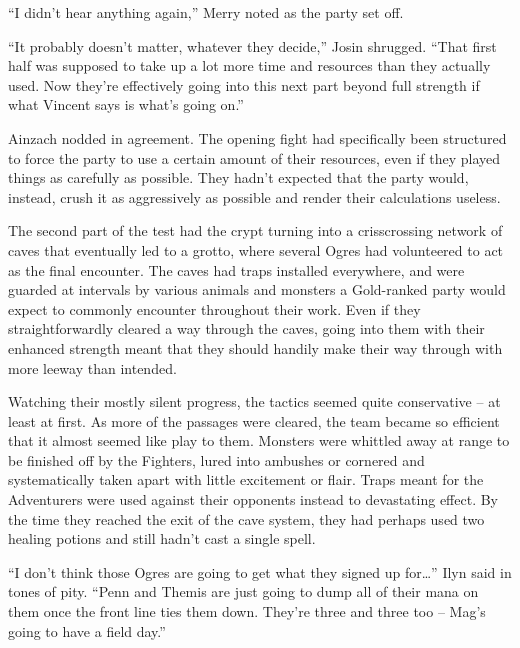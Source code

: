 

“I didn’t hear anything again,” Merry noted as the party set off.

 

“It probably doesn’t matter, whatever they decide,” Josin shrugged. “That first half was supposed to take up a lot more time and resources than they actually used. Now they’re effectively going into this next part beyond full strength if what Vincent says is what’s going on.”

 

Ainzach nodded in agreement. The opening fight had specifically been structured to force the party to use a certain amount of their resources, even if they played things as carefully as possible. They hadn’t expected that the party would, instead, crush it as aggressively as possible and render their calculations useless.

 

The second part of the test had the crypt turning into a crisscrossing network of caves that eventually led to a grotto, where several Ogres had volunteered to act as the final encounter. The caves had traps installed everywhere, and were guarded at intervals by various animals and monsters a Gold-ranked party would expect to commonly encounter throughout their work. Even if they straightforwardly cleared a way through the caves, going into them with their enhanced strength meant that they should handily make their way through with more leeway than intended.

 

Watching their mostly silent progress, the tactics seemed quite conservative – at least at first. As more of the passages were cleared, the team became so efficient that it almost seemed like play to them. Monsters were whittled away at range to be finished off by the Fighters, lured into ambushes or cornered and systematically taken apart with little excitement or flair. Traps meant for the Adventurers were used against their opponents instead to devastating effect. By the time they reached the exit of the cave system, they had perhaps used two healing potions and still hadn’t cast a single spell.

 

“I don’t think those Ogres are going to get what they signed up for…” Ilyn said in tones of pity. “Penn and Themis are just going to dump all of their mana on them once the front line ties them down. They’re three and three too – Mag’s going to have a field day.”

